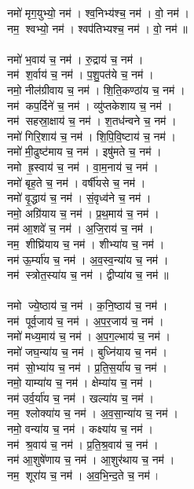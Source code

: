 नमो॑ मृग॒युभ्यो॒ नम॑। श्व॒निभ्य॑श्च॒ नम॑। वो॒ नम॑। \\
नम॒ श्वभ्यो॒ नम॑। श्वप॑तिभ्यश्च॒ नम॑। वो॒ नम॑॥ \\
\\
नमो॑ भ॒वाय॑ च॒ नम॑। रु॒द्राय॑ च॒ नम॑। \\
नम॑ श॒र्वाय॑ च॒ नम॑। प॒शु॒पत॑ये च॒ नम॑।\\
नमो॒ नील॑ग्रीवाय च॒ नम॑। शि॒ति॒कण्ठा॑य च॒ नम॑। \\
नम॑ कप॒र्दिने॑ च॒ नम॑। व्यु॑प्तकेशाय च॒ नम॑।\\
नम॑ सहस्रा॒क्षाय॑ च॒ नम॑। श॒तध॑न्वने च॒ नम॑। \\
नमो॑ गिरि॒शाय॑ च॒ नम॑। शि॒पि॒वि॒ष्टाय॑ च॒ नम॑।\\
नमो॑ मी॒ढुष्ट॑माय च॒ नम॑। इषु॑मते च॒ नम॑। \\
नमो ह्र॒स्वाय॑ च॒ नम॑। वा॒म॒नाय॑ च॒ नम॑।\\
नमो॑ बृह॒ते च॒ नम॑। वर्षी॑यसे च॒ नम॑। \\
नमो॑ वृ॒द्धाय॑ च॒ नम॑। सं॒वृध्व॑ने च॒ नम॑। \\
नमो॒ अग्रि॑याय च॒ नम॑। प्र॒थ॒माय॑ च॒ नम॑। \\
नम॑ आ॒शवे॑ च॒ नम॑। अ॒जि॒राय॑ च॒ नम॑।\\
नम॒ शीघ्रि॑याय च॒ नम॑। शीभ्या॑य च॒ नम॑। \\
नम॑ ऊ॒र्म्या॑य च॒ नम॑। अ॒व॒स्व॒न्या॑य च॒ नम॑। \\
नम॑ स्त्रोत॒स्या॑य च॒ नम॑। द्वीप्या॑य च॒ नम॑॥\\
\\
नमो ज्ये॒ष्ठाय॑ च॒ नम॑। क॒नि॒ष्ठाय॑ च॒ नम॑। \\
नम॑ पूर्व॒जाय॑ च॒ नम॑। अ॒प॒र॒जाय॑ च॒ नम॑। \\
नमो॑ मध्य॒माय॑ च॒ नम॑। अ॒प॒ग॒ल्भाय॑ च॒ नम॑। \\
नमो॑ जघ॒न्या॑य च॒ नम॑। बुध्नि॑याय च॒ नम॑।\\
नम॑ सो॒भ्या॑य च॒ नम॑। प्र॒ति॒स॒र्या॑य च॒ नम॑। \\
नमो॒ याम्या॑य च॒ नम॑। क्षेम्या॑य च॒ नम॑। \\
नम॑ उर्व॒र्या॑य च॒ नम॑। खल्या॑य च॒ नम॑। \\
नम॒ श्लोक्या॑य च॒ नम॑। अ॒व॒सा॒न्या॑य च॒ नम॑। \\
नमो॒ वन्या॑य च॒ नम॑। कक्ष्या॑य च॒ नम॑। \\
नम॑ श्र॒वाय॑ च॒ नम॑। प्र॒ति॒श्र॒वाय॑ च॒ नम॑। \\
नम॑ आ॒शुषे॑णाय च॒ नम॑। आ॒शुर॑थाय च॒ नम॑। \\
नम॒ शूरा॑य च॒ नम॑। अ॒व॒भि॒न्द॒ते च॒ नम॑। \\
